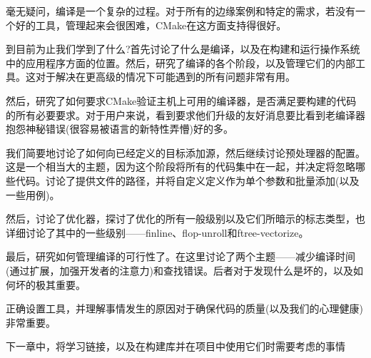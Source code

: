 
毫无疑问，编译是一个复杂的过程。对于所有的边缘案例和特定的需求，若没有一个好的工具，管理起来会很困难，CMake在这方面支持得很好。

到目前为止我们学到了什么?首先讨论了什么是编译，以及在构建和运行操作系统中的应用程序方面的位置。然后，研究了编译的各个阶段，以及管理它们的内部工具。这对于解决在更高级的情况下可能遇到的所有问题非常有用。

然后，研究了如何要求CMake验证主机上可用的编译器，是否满足要构建的代码的所有必要要求。对于用户来说，看到要求他们升级的友好消息要比看到老编译器抱怨神秘错误(很容易被语言的新特性弄懵)好的多。

我们简要地讨论了如何向已经定义的目标添加源，然后继续讨论预处理器的配置。这是一个相当大的主题，因为这个阶段将所有的代码集中在一起，并决定将忽略哪些代码。讨论了提供文件的路径，并将自定义定义作为单个参数和批量添加(以及一些用例)。

然后，讨论了优化器，探讨了优化的所有一般级别以及它们所暗示的标志类型，也详细讨论了其中的一些级别——finline、flop-unroll和ftree-vectorize。

最后，研究如何管理编译的可行性了。在这里讨论了两个主题——减少编译时间(通过扩展，加强开发者的注意力)和查找错误。后者对于发现什么是坏的，以及如何坏的极其重要。

正确设置工具，并理解事情发生的原因对于确保代码的质量(以及我们的心理健康)非常重要。

下一章中，将学习链接，以及在构建库并在项目中使用它们时需要考虑的事情


